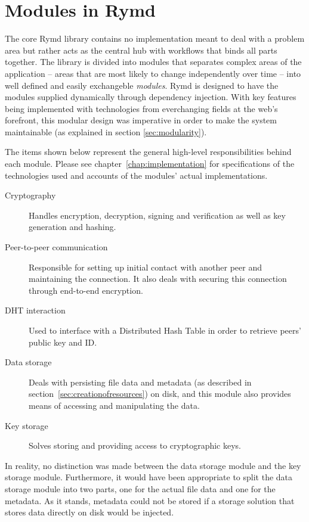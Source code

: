 \section{Modules in Rymd}
\label{sec:modules}


The core Rymd library contains no implementation meant to deal with a problem area but rather acts as the central hub with workflows that binds all parts together. The library is divided into modules that separates complex areas of the application – areas that are most likely to change independently over time – into well defined and easily exchangeble \emph{modules}. Rymd is designed to have the modules supplied dynamically through dependency injection. With key features being implemented with technologies from everchanging fields at the web's forefront, this modular design was imperative in order to make the system maintainable (as explained in section \ref{sec:modularity}).

The items shown below represent the general high-level responsibilities behind each module. Please see chapter~\ref{chap:implementation} for specifications of the technologies used and accounts of the modules' actual implementations.

\begin{description}
  \item [Cryptography] Handles encryption, decryption, signing and verification as well as key generation and hashing.
  \item [Peer-to-peer communication] Responsible for setting up initial contact with another peer and maintaining the connection. It also deals with securing this connection through end-to-end encryption.
  \item [DHT interaction] Used to interface with a Distributed Hash Table in order to retrieve peers' public key and ID.
  \item [Data storage] Deals with persisting file data and metadata (as described in section~\ref{sec:creationofresources}) on disk, and this module also provides means of accessing and manipulating the data.
  \item [Key storage] Solves storing and providing access to cryptographic keys.
\end{description}

In reality, no distinction was made between the data storage module and the key storage module. Furthermore, it would have been appropriate to split the data storage module into two parts, one for the actual file data and one for the metadata. As it stands, metadata could not be stored if a storage solution that stores data directly on disk would be injected.
